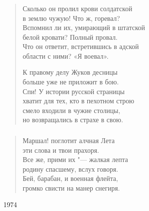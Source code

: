 \documentclass{beamer}
\begin{document}
\begin{frame}
\frametitle{}

\begin{verse}

Сколько он пролил крови солдатской\\
в землю чужую! Что ж, горевал?\\
Вспомнил ли их, умирающий в штатской\\
белой кровати? Полный провал.\\
Что он ответит, встретившись в адской\\
области с ними? «Я воевал».

К правому делу Жуков десницы\\
больше уже не приложит в бою.\\
Спи! У истории русской страницы\\
хватит для тех, кто в пехотном строю\\
смело входили в чужие столицы,\\
но возвращались в страхе в свою.
\end{verse}
\end{frame}


\begin{frame}
\frametitle{}

\begin{verse}
Маршал! поглотит алчная Лета\\
эти слова и твои прахоря.\\
Все же, прими их "--- жалкая лепта\\
родину спасшему, вслух говоря.\\
Бей, барабан, и военная флейта,\\
громко свисти на манер снегиря.


\end{verse}
1974
\end{frame}

\end{document}

